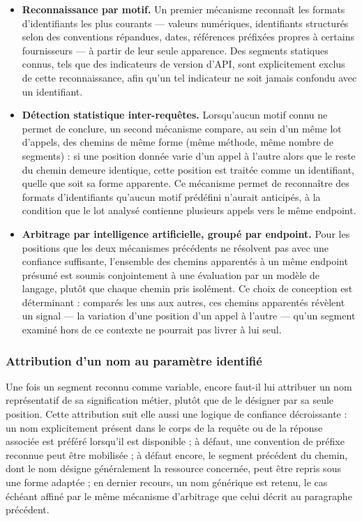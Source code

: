 \begin{itemize}
    \item \textbf{Reconnaissance par motif.} Un premier mécanisme reconnaît les formats d'identifiants les plus courants — valeurs numériques, identifiants structurés selon des conventions répandues, dates, références préfixées propres à certains fournisseurs — à partir de leur seule apparence. Des segments statiques connus, tels que des indicateurs de version d'API, sont explicitement exclus de cette reconnaissance, afin qu'un tel indicateur ne soit jamais confondu avec un identifiant.
    \item \textbf{Détection statistique inter-requêtes.} Lorsqu'aucun motif connu ne permet de conclure, un second mécanisme compare, au sein d'un même lot d'appels, des chemins de même forme (même méthode, même nombre de segments) : si une position donnée varie d'un appel à l'autre alors que le reste du chemin demeure identique, cette position est traitée comme un identifiant, quelle que soit sa forme apparente. Ce mécanisme permet de reconnaître des formats d'identifiants qu'aucun motif prédéfini n'aurait anticipés, à la condition que le lot analysé contienne plusieurs appels vers le même endpoint.
    \item \textbf{Arbitrage par intelligence artificielle, groupé par endpoint.} Pour les positions que les deux mécanismes précédents ne résolvent pas avec une confiance suffisante, l'ensemble des chemins apparentés à un même endpoint présumé est soumis conjointement à une évaluation par un modèle de langage, plutôt que chaque chemin pris isolément. Ce choix de conception est déterminant : comparés les uns aux autres, ces chemins apparentés révèlent un signal — la variation d'une position d'un appel à l'autre — qu'un segment examiné hors de ce contexte ne pourrait pas livrer à lui seul.
\end{itemize}

\subsubsection{Attribution d'un nom au paramètre identifié}

Une fois un segment reconnu comme variable, encore faut-il lui attribuer un nom représentatif de sa signification métier, plutôt que de le désigner par sa seule position. Cette attribution suit elle aussi une logique de confiance décroissante : un nom explicitement présent dans le corps de la requête ou de la réponse associée est préféré lorsqu'il est disponible ; à défaut, une convention de préfixe reconnue peut être mobilisée ; à défaut encore, le segment précédent du chemin, dont le nom désigne généralement la ressource concernée, peut être repris sous une forme adaptée ; en dernier recours, un nom générique est retenu, le cas échéant affiné par le même mécanisme d'arbitrage que celui décrit au paragraphe précédent.

